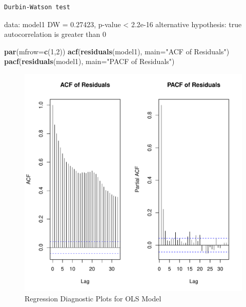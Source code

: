\documentclass[
]{article}
\newenvironment{Shaded}{\begin{snugshade}}{\end{snugshade}}
\newcommand{\AttributeTok}[1]{\textcolor[rgb]{0.13,0.29,0.53}{#1}}
\newcommand{\DecValTok}[1]{\textcolor[rgb]{0.00,0.00,0.81}{#1}}
\newcommand{\FunctionTok}[1]{\textcolor[rgb]{0.13,0.29,0.53}{\textbf{#1}}}
\newcommand{\NormalTok}[1]{#1}
\newcommand{\StringTok}[1]{\textcolor[rgb]{0.31,0.60,0.02}{#1}}
\begin{document}
\begin{verbatim}
Durbin-Watson test
\end{verbatim}

data: model1 DW = 0.27423, p-value \textless{} 2.2e-16 alternative
hypothesis: true autocorrelation is greater than 0

\begin{Shaded}
\begin{Highlighting}[]
  \FunctionTok{par}\NormalTok{(}\AttributeTok{mfrow=}\FunctionTok{c}\NormalTok{(}\DecValTok{1}\NormalTok{,}\DecValTok{2}\NormalTok{))}
  \FunctionTok{acf}\NormalTok{(}\FunctionTok{residuals}\NormalTok{(model1), }\AttributeTok{main=}\StringTok{"ACF of Residuals"}\NormalTok{)}
  \FunctionTok{pacf}\NormalTok{(}\FunctionTok{residuals}\NormalTok{(model1), }\AttributeTok{main=}\StringTok{"PACF of Residuals"}\NormalTok{)}
\end{Highlighting}
\end{Shaded}

\begin{figure}
\centering
\includegraphics{FinalProject_files/figure-latex/model1-diagnostics-4.pdf}
\caption{Regression Diagnostic Plots for OLS Model}
\end{figure}
\end{document}
